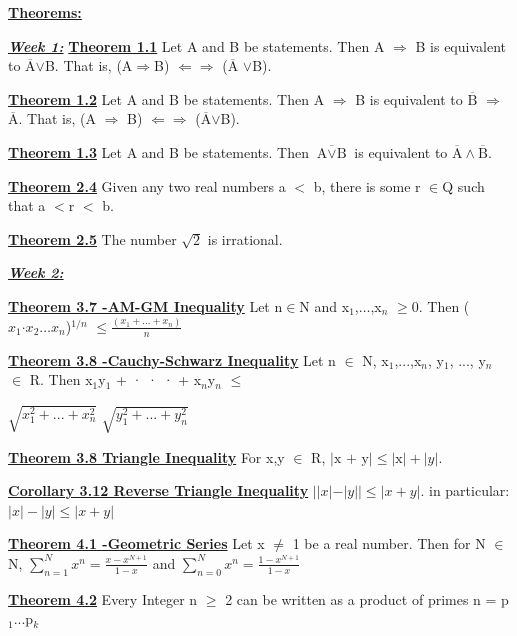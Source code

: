 \documentclass[10pt]{article}
\title{}
\begin{document}
\fontsize{14}{10}\textbf{\underline{Theorems:}}
\par
\fontsize{12}{10}

\textbf{\textit{\underline{Week 1:}}}
\textbf{\underline{Theorem 1.1}} Let A and B be statements. Then A $\Rightarrow $ B is equivalent to $ \overline{\mbox{A}}$$ \vee $B. That is,
(A$\Rightarrow $B) $ \Leftarrow \Rightarrow $ ($ \overline{\mbox{A}}$ $ \vee $B).
\par
\textbf{\underline{Theorem 1.2}}
Let A and B be statements. Then A $ \Rightarrow $ B is equivalent to $ \overline{\mbox{B}}$ $ \Rightarrow $ $ \overline{\mbox{A}}$. That
 is, (A $ \Rightarrow $ B) $ \Leftarrow \Rightarrow $ ($ \overline{\mbox{A}}$$ \vee $B).
\par
\textbf{\underline{Theorem 1.3}}
Let A and B be statements. Then $\overline{\mbox{A} \vee \mbox{B}}$   is equivalent to $ \overline{\mbox{A}} \wedge \overline{\mbox{B}} $.
\par
\textbf{\underline{Theorem 2.4}}
Given any two real numbers a $<$ b, there is some r $\in $Q such that a $<$r $<$ b.
\par
\textbf{\underline{Theorem 2.5}}
The number $\sqrt{2}$ is irrational.

\par
\textbf{\textit{\underline{Week 2:}}}
\par\textbf{\underline{Theorem 3.7 -AM-GM Inequality}}
 Let n$\in$N and x$_1$,$\dots$,x$_n$ $\geq$0. Then
($x_1 \mbox{·} x_2 \dots x_n$)$^{1/n}$ $ \leq \frac{(x_1 + \dots +x_n)}{n}$
\par\textbf{\underline{Theorem 3.8 -Cauchy-Schwarz Inequality}}
 Let n $\in$ N, x$_1$,...,x$_n$, y$_1$, ..., y$_n$ $\in$ R. Then
x$_1$y$_1$ + · · · + x$_n$y$_n$ $\leq$ \par
$\sqrt{x_1^2 + ... + x_n^2}$ 
$\sqrt{y_1^2 + ... + y_n^2}$
\par\textbf{\underline{Theorem 3.8 Triangle Inequality}}
For x,y $\in$ R,
$|\mbox{x + y}| \leq |\mbox{x}| + |y|.$
\par\textbf{\underline{Corollary 3.12 Reverse Triangle Inequality}}
$||x| - |y|| \leq |x+y|.$
in particular: $ |x| -|y| \leq |x+y|$
\par\textbf{\underline{Theorem 4.1 -Geometric Series}}
Let x $\neq$ 1 be a real number. Then for N $\in $ N,
$\sum_{n=1}^{N} x^n = \frac{x-x^{N+1}}{1-x} $ and $\sum_{n=0}^{N} x^n = \frac{1-x^{N+1}}{1-x} $
\par\textbf{\underline{Theorem 4.2}}
Every Integer n $\geq$ 2 can be written as a product of primes n = p$_1$...p$_k$
\end{document}

